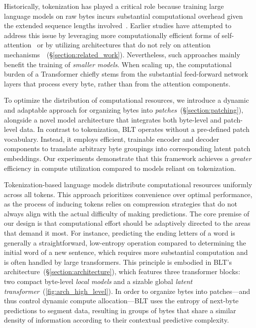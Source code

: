 Historically, tokenization has played a critical role because training large language models on raw bytes incurs substantial computational overhead given the extended sequence lengths involved~\citep{xue2022byt5}. Earlier studies have attempted to address this issue by leveraging more computationally efficient forms of self-attention~\citep{el2020characterbert, clark2022canine} or by utilizing architectures that do not rely on attention mechanisms~\citep{wang2024mambabyte}~(\S\ref{section:related_work}). Nevertheless, such approaches mainly benefit the training of \textit{smaller models}. When scaling up, the computational burden of a Transformer chiefly stems from the substantial feed-forward network layers that process every byte, rather than from the attention components.

To optimize the distribution of computational resources, we introduce a dynamic and adaptable approach for organizing bytes into \textit{patches}~(\S\ref{section:patching}), alongside a novel model architecture that integrates both byte-level and patch-level data. In contrast to tokenization, {\textsc BLT} operates without a pre-defined patch vocabulary. Instead, it employs efficient, trainable encoder and decoder components to translate arbitrary byte groupings into corresponding latent patch embeddings. Our experiments demonstrate that this framework achieves a \textit{greater} efficiency in compute utilization compared to models reliant on tokenization.

Tokenization-based language models distribute computational resources uniformly across all tokens. This approach prioritizes convenience over optimal performance, as the process of inducing tokens relies on compression strategies that do not always align with the actual difficulty of making predictions. The core premise of our design is that computational effort should be adaptively directed to the areas that demand it most. For instance, predicting the ending letters of a word is generally a straightforward, low-entropy operation compared to determining the initial word of a new sentence, which requires more substantial computation and is often handled by large transformers. This principle is embodied in {\textsc BLT}'s architecture~(\S\ref{section:architecture}), which features three transformer blocks: two compact byte-level \textit{local models} and a sizable global \textit{latent transformer}~(\autoref{fig:arch_high_level}).
In order to organize bytes into patches—and thus control dynamic compute allocation—{\textsc BLT} uses the entropy of next-byte predictions to segment data, resulting in groups of bytes that share a similar density of information according to their contextual predictive complexity.

